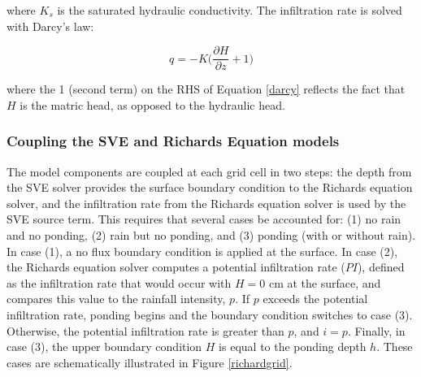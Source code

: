\documentclass{article}
\begin{document}
where $K_s$ is the saturated hydraulic conductivity.
The infiltration rate is solved with Darcy's law:

\begin{equation}
q =-  K \bigg(\dfrac{\partial H}{\partial z} + 1\bigg)
\label{darcy}
\end{equation}

where the 1  (second term) on the RHS of Equation \ref{darcy} reflects the fact that $H$ is the matric head, as opposed to the hydraulic head.

%
% 

\subsubsection*{Coupling the SVE and Richards Equation models}

The model components are coupled at each grid cell in two steps: the depth from the SVE solver provides the surface boundary condition to the Richards equation solver, and the infiltration rate from the Richards equation solver is used by the SVE source term. This requires that several cases be accounted for: (1) no rain and no ponding, (2) rain but no ponding, and (3)  ponding (with or without rain).   In case (1), a no flux boundary condition is applied at the surface.
 In case (2), the Richards equation solver computes a potential infiltration rate ($PI$), defined as the infiltration rate that would occur with $H=0
 $ cm at the surface, and compares this value to the rainfall intensity, $p$.  If $p$ exceeds the potential infiltration rate, ponding begins and the  boundary condition switches to case (3).  Otherwise, the potential infiltration rate is greater than $p$, and $i=p$. Finally, in case (3), the upper boundary condition $H$ is equal to the ponding depth $h$.  These cases are schematically illustrated in Figure \ref{richardgrid}.
 
\end{document}
